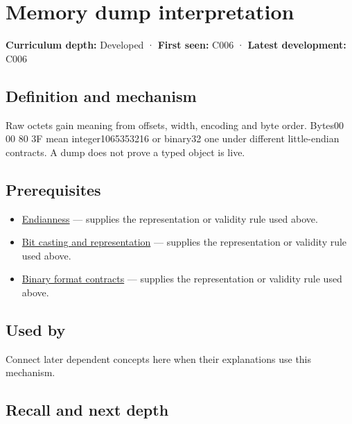 \hypertarget{appendix-230b59c0676b}{}
\section{Memory dump interpretation}\label{appendix-230b59c0676b-memory-dump-interpretation}

\textbf{Curriculum depth:} Developed · \textbf{First seen:} C006 · \textbf{Latest development:} C006

\subsection{Definition and mechanism}\label{appendix-230b59c0676b-definition-and-mechanism}

Raw octets gain meaning from offsets, width, encoding and byte order. Bytes00 00 80 3F mean integer1065353216 or binary32 one under different little-endian contracts. A dump does not prove a typed object is live.

\subsection{Prerequisites}\label{appendix-230b59c0676b-prerequisites}

\begin{itemize}
\tightlist
\item
  \hyperref[appendix-bc07c3d25b18]{Endianness} --- supplies the representation or validity rule used above.
\item
  \hyperref[appendix-34ee45f161c1]{Bit casting and representation} --- supplies the representation or validity rule used above.
\item
  \hyperref[appendix-590bbb2424c1]{Binary format contracts} --- supplies the representation or validity rule used above.
\end{itemize}

\subsection{Used by}\label{appendix-230b59c0676b-used-by}

Connect later dependent concepts here when their explanations use this mechanism.

\subsection{Recall and next depth}\label{appendix-230b59c0676b-recall-and-next-depth}

